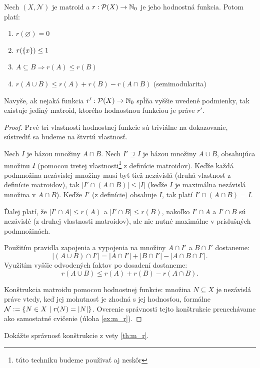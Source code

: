 \begin{theorem}
\label{th:m_r}
Nech $(X, \mathcal{N})$ je matroid a $r:\mathcal{P}(X) \to \mathbb{N}_0$ je jeho hodnostná funkcia. Potom platí:
\begin{enumerate}
    \item $r(\varnothing) = 0$
    \item $r(\left\{x\right\}) \leq 1$
    \item $A \subseteq B \Longrightarrow r(A) \leq r(B)$
    \item $r(A \cup B) \leq r(A) + r(B) - r(A \cap B)$ (semimodularita)
\end{enumerate}

Navyše, ak nejaká funkcia $r':\mathcal{P}(X)\to\mathbb{N}_0$ spĺňa vyššie uvedené podmienky, tak existuje jediný matroid, ktorého
hodnostnou funkciou je práve $r'$.
\end{theorem}
\begin{proof}
Prvé tri vlastnosti hodnostnej funkcie sú triviálne na dokazovanie, sústrediť sa budeme na štvrtú vlastnosť.

Nech $I$ je bázou množiny $A\cap B$.
Nech $I' \supseteq I$ je bázou množiny $A \cup B$, obsahujúca množinu $I$ (pomocou tretej vlastnosti\footnote{túto techniku budeme použivať aj neskôr} z definície matroidov).
Keďže každá podmnožina nezávislej množiny musí byť tiež nezávislá (druhá vlastnosť z definície matroidov), tak $|I' \cap (A \cap B)| \leq |I|$ (keďže $I$ je maximálna nezávislá množina v $A\cap B$). Keďže $I'$ (z definície) obsahuje $I$, tak platí $I' \cap (A \cap B) = I$. 

Ďalej platí, že $|I' \cap A| \leq r(A)$ a $|I' \cap B| \leq r(B)$, nakoľko $I' \cap A$ a $I' \cap B$ sú nezávislé (z druhej vlastnosti matroidov), ale nie nutné maximálne v príslušných podmnožinách.

Použitím pravidla zapojenia a vypojenia na množiny $A \cap I'$ a $B \cap I'$ dostaneme:
$$|(A \cup B) \cap I'| = |A \cap I'| + |B \cap I'| - |A \cap B \cap I'|.$$
Využitím vyššie odvodených faktov po dosadení dostaneme:
$$r(A \cup B) \leq r(A) + r(B) - r(A \cap B).$$

Konštrukcia matroidu pomocou hodnostnej funkcie: množina $N \subseteq X$ je nezávislá práve vtedy, keď jej mohutnosť je zhodná s jej hodnosťou, formálne $\mathcal{N} := \left\{N \in X~|~r(N) = |N|\right\}$. Overenie správnosti tejto konštrukcie prenechávame ako samostatné cvičenie (úloha \ref{ex:m_r}).
\end{proof}
\begin{exercise}
\label{ex:m_r}
Dokážte správnosť konštrukcie z vety \ref{th:m_r}.
\end{exercise}

